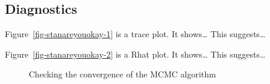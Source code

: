 \documentclass[
  letterpaper,
  DIV=11,
  numbers=noendperiod]{scrartcl}
\begin{document}
\subsection{Diagnostics}\label{diagnostics}

Figure~\ref{fig-stanareyouokay-1} is a trace plot. It shows\ldots{} This
suggests\ldots{}

Figure~\ref{fig-stanareyouokay-2} is a Rhat plot. It shows\ldots{} This
suggests\ldots{}

\begin{figure}

\begin{minipage}{0.50\linewidth}



\end{minipage}%
%
\begin{minipage}{0.50\linewidth}



\end{minipage}%

\caption{\label{fig-stanareyouokay}Checking the convergence of the MCMC
algorithm}

\end{figure}%
\end{document}
